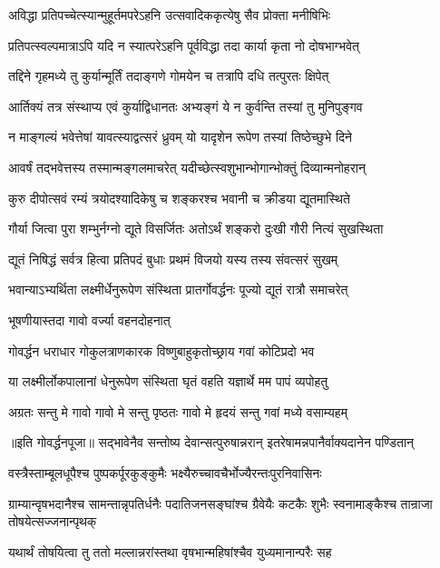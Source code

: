 \twolineshloka
{अविद्धा प्रतिपच्चेत्स्यान्मुहूर्तमपरेऽहनि}
{उत्सवादिककृत्येषु सैव प्रोक्ता मनीषिभिः} %

\twolineshloka
{प्रतिपत्स्वल्पमात्राऽपि यदि न स्यात्परेऽहनि}
{पूर्वविद्धा तदा कार्या कृता नो दोषभाग्भवेत्} %

\twolineshloka
{तद्दिने गृहमध्ये तु कुर्यान्मूर्तिं तदाङ्गणे}
{गोमयेन च तत्रापि दधि तत्पुरतः क्षिपेत्} %

\twolineshloka
{आर्तिक्यं तत्र संस्थाप्य एवं कुर्याद्विधानतः}
{अभ्यङ्गं ये न कुर्वन्ति तस्यां तु मुनिपुङ्गव} %

\twolineshloka
{न माङ्गल्यं भवेत्तेषां यावत्स्याद्वत्सरं ध्रुवम्}
{यो यादृशेन रूपेण तस्यां तिष्ठेच्छुभे दिने} %

\twolineshloka
{आवर्षं तद्भवेत्तस्य तस्मान्मङ्गलमाचरेत्}
{यदीच्छेत्स्वशुभान्भोगान्भोक्तुं दिव्यान्मनोहरान्} %

\twolineshloka
{कुरु दीपोत्सवं रम्यं त्रयोदश्यादिकेषु च}
{शङ्करश्च भवानी च क्रीडया द्यूतमास्थिते} %

\twolineshloka
{गौर्या जित्वा पुरा शम्भुर्नग्नो द्यूते विसर्जितः}
{अतोऽर्थं शङ्करो दुःखी गौरी नित्यं सुखस्थिता} %

\twolineshloka
{द्यूतं निषिद्धं सर्वत्र हित्वा प्रतिपदं बुधाः}
{प्रथमं विजयो यस्य तस्य संवत्सरं सुखम्} %

\twolineshloka
{भवान्याऽभ्यर्थिता लक्ष्मीर्धेनुरूपेण संस्थिता}
{प्रातर्गोवर्द्धनः पूज्यो द्यूतं रात्रौ समाचरेत्} %


\onelineshloka
{भूषणीयास्तदा गावो वर्ज्या वहनदोहनात्} %

\twolineshloka
{गोवर्द्धन धराधार गोकुलत्राणकारक}
{विष्णुबाहुकृतोच्छ्राय गवां कोटिप्रदो भव} %

\twolineshloka
{या लक्ष्मीर्लोकपालानां धेनुरूपेण संस्थिता}
{घृतं वहति यज्ञार्थे मम पापं व्यपोहतु} %

\twolineshloka
{अग्रतः सन्तु मे गावो गावो मे सन्तु पृष्ठतः}
{गावो मे हृदयं सन्तु गवां मध्ये वसाम्यहम्} %


॥इति गोवर्द्धनपूजा॥
\twolineshloka
{सद्भावेनैव सन्तोष्य देवान्सत्पुरुषान्नरान्}
{इतरेषामन्नपानैर्वाक्यदानेन पण्डितान्} %

\twolineshloka
{वस्त्रैस्ताम्बूलधूपैश्च पुष्पकर्पूरकुङ्कुमैः}
{भक्ष्यैरुच्चावचैर्भोज्यैरन्तःपुरनिवासिनः} %

\threelineshloka
{ग्राम्यान्वृषभदानैश्च सामन्तान्नृपतिर्धनैः}
{पदातिजनसङ्घांश्च ग्रैवेयैः कटकैः शुभैः}
{स्वनामाङ्कैश्च तान्राजा तोषयेत्सज्जनान्पृथक्} %

\twolineshloka
{यथार्थं तोषयित्वा तु ततो मल्लान्नरांस्तथा}
{वृषभान्महिषांश्चैव युध्यमानान्परैः सह} %

